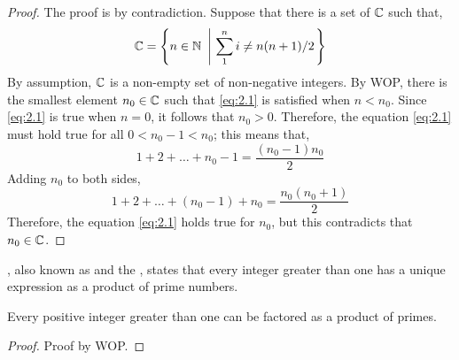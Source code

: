 \begin{proof}
    The proof is by contradiction. Suppose that there is a set of $\mathbb{C}$ such that,
    \begin{equation*}
        \ms{C} = \left\{ n \in \ms{N} \ \left| \ \sum_{1}^{n} i \neq n(n + 1)/2 \right. \right\}
    \end{equation*}
    By assumption, $\mathbb{C}$ is a non-empty set of non-negative integers. By WOP, there is the smallest
    element $n_0 \in \mathbb{C}$ such that \ref{eq:2.1} is satisfied when $n < n_0$. Since \ref{eq:2.1} is true
    when $n = 0$, it follows that $n_0 > 0$. Therefore, the equation \ref{eq:2.1} must hold true for all
    $0 < n_0 - 1 < n_0$; this means that,
    \begin{equation*}
        1 + 2 + \ldots + n_0 - 1 = \dfrac{(n_0 - 1)n_0}{2}
    \end{equation*}
    Adding $n_0$ to both sides,
    \begin{equation*}
        1 + 2 + \ldots + (n_0 - 1) + n_0 = \dfrac{n_0(n_0 + 1)}{2}
    \end{equation*}
    Therefore, the equation \ref{eq:2.1} holds true for $n_0$, but this contradicts
    that ${n_0 \in \mathbb{C}}$.
\end{proof}

, also known as 
and the , states that every integer greater
than one has a unique expression as a product of prime numbers.

\begin{claim}
    Every positive integer greater than one can be factored as a product
    of primes.
\end{claim}

\begin{proof}
    Proof by WOP.
\end{proof}
